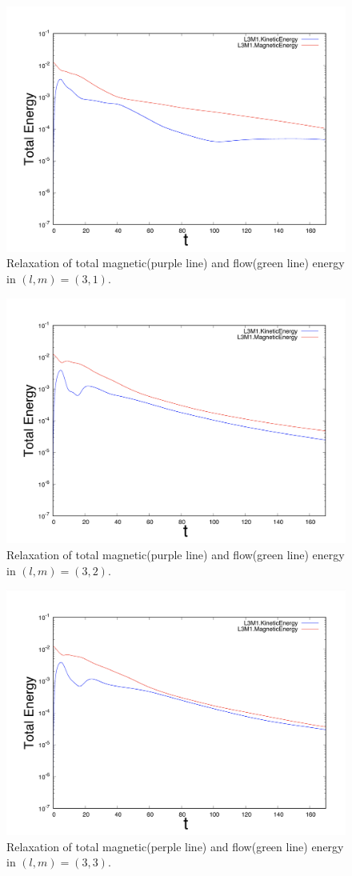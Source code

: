 \documentclass[12pt]{jsarticle}
\begin{document}
\begin{figure}[H]
\centering
\includegraphics[height=0.5\textheight,width=0.7\hsize,angle=0,keepaspectratio]{./Image/L3M1_graph2.png}
\caption{Relaxation of total magnetic(purple line) and flow(green line) energy in $(l,m)=(3,1)$.} \label{L3M1_graph}
\end{figure}
\begin{figure}[H]
\centering
\includegraphics[height=0.5\textheight,width=0.7\hsize,angle=0,keepaspectratio]{./Image/L3M2_graph2.png}
\caption{Relaxation of total magnetic(purple line) and flow(green line) energy in $(l,m)=(3,2)$.} \label{L3M2_graph}
\end{figure}
\begin{figure}[H]
\centering
\includegraphics[height=0.5\textheight,width=0.7\hsize,angle=0,keepaspectratio]{./Image/L3M3_graph2.png}
\caption{Relaxation of total magnetic(perple line) and flow(green line) energy in $(l,m)=(3,3)$.} \label{L3M3_graph}
\end{figure}
\end{document}
